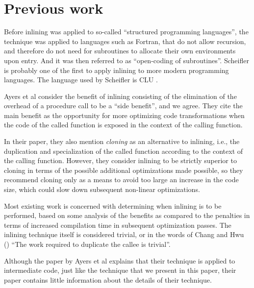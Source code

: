 \section{Previous work}

Before inlining was applied to so-called ``structured programming
languages'', the technique was applied to languages such as Fortran,
that do not allow recursion, and therefore do not need for subroutines
to allocate their own environments upon entry.  And it was then
referred to as ``open-coding of subroutines''.  Scheifler
\cite{Scheifler:1977:AIS:359810.359830} is probably one of the first
to apply inlining to more modern programming languages.  The language
used by Scheifler is CLU \cite{Liskov:1977:AMC:359763.359789}.

Ayers et al \cite{Ayers:1997:AI:258915.258928} consider the benefit of
inlining consisting of the elimination of the overhead of a procedure
call to be a ``side benefit'', and we agree.  They cite the main
benefit as the opportunity for more optimizing code transformations
when the code of the called function is exposed in the context of the
calling function.

In their paper, they also mention \emph{cloning} as an alternative to
inlining, i.e., the duplication and specialization of the called
function according to the context of the calling function.  However,
they consider inlining to be strictly superior to cloning in terms of
the possible additional optimizations made possible, so they recommend
cloning only as a means to avoid too large an increase in the code
size, which could slow down subsequent non-linear optimizations.

Most existing work is concerned with determining when inlining is to
be performed, based on some analysis of the benefits as compared to
the penalties in terms of increased compilation time in subsequent
optimization passes.  The inlining technique itself is considered
trivial, or in the words of Chang and Hwu
(\cite{Chang:1989:IFE:73141.74840, Chang:1989:IFE:74818.74840}) ``The
work required to duplicate the callee is trivial''.

Although the paper by Ayers et al explains that their technique is
applied to intermediate code, just like the technique that we present
in this paper, their paper contains little information about the details
of their technique.

